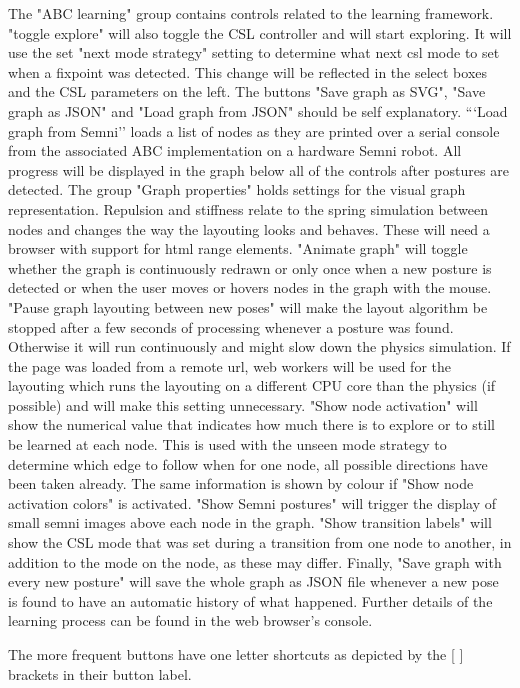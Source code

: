\documentclass[10pt,a4paper]{article}
\begin{document}
The "ABC learning" group contains controls related to the learning framework. "toggle explore" will also toggle the CSL controller and will start exploring. It will use the set "next mode strategy" setting to determine what next csl mode to set when a fixpoint was detected. This change will be reflected in the select boxes and the CSL parameters on the left.
The buttons "Save graph as SVG", "Save graph as JSON" and "Load graph from JSON" should be self explanatory. ```Load graph from Semni'' loads a list of nodes as they are printed over a serial console from the associated ABC implementation on a hardware Semni robot.
All progress will be displayed in the graph below all of the controls after postures are detected. The group "Graph properties" holds settings for the visual graph representation. Repulsion and stiffness relate to the spring simulation between nodes and changes the way the layouting looks and behaves. These will need a browser with support for html range elements. "Animate graph" will toggle whether the graph is continuously redrawn or only once when a new posture is detected or when the user moves or hovers nodes in the graph with the mouse. "Pause graph layouting between new poses" will make the layout algorithm be stopped after a few seconds of processing whenever a posture was found. Otherwise it will run continuously and might slow down the physics simulation. If the page was loaded from a remote url, web workers will be used for the layouting which runs the layouting on a different CPU core than the physics (if possible) and will make this setting unnecessary.
"Show node activation" will show the numerical value that indicates how much there is to explore or to still be learned at each node. This is used with the unseen mode strategy to determine which edge to follow when for one node, all possible directions have been taken already. The same information is shown by colour if "Show node activation colors" is activated. "Show Semni postures" will trigger the display of small semni images above each node in the graph. "Show transition labels" will show the CSL mode that was set during a transition from one node to another, in addition to the mode on the node, as these may differ. Finally, "Save graph with every new posture" will save the whole graph as JSON file whenever a new pose is found to have an automatic history of what happened.
Further details of the learning process can be found in the web browser's console.

The more frequent buttons have one letter shortcuts as depicted by the [ ] brackets in their button label.
\end{document}
